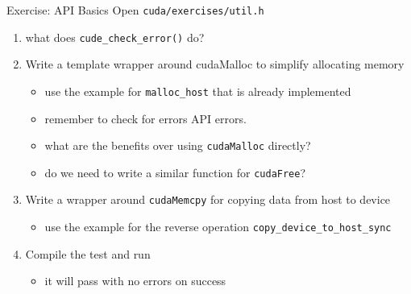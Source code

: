 \documentclass[aspectratio=43]{beamer}
\newcommand{\lst}[1]{\colorbox{white!90!blue}{\lstinline!#1!}}
\begin{document}
\begin{frame}[fragile]{Exercise: API Basics}
    Open \lst{cuda/exercises/util.h}
    \begin{enumerate}
        \item what does \lst{cude_check_error()} do?

        \item Write a template wrapper around cudaMalloc to simplify allocating memory
        \begin{itemize}
            \item use the example for \lst{malloc_host} that is already implemented
            \item remember to check for errors API errors.
            \item what are the benefits over using \lst{cudaMalloc} directly?
            \item do we need to write a similar function for \lst{cudaFree}?
        \end{itemize}

        \item Write a wrapper around \lst{cudaMemcpy} for copying data from host to device
        \begin{itemize}
            \item use the example for the reverse operation \lst{copy_device_to_host_sync}
        \end{itemize}

        \item Compile the test and run
        \begin{itemize}
            \item it will pass with no errors on success
        \end{itemize}
    \end{enumerate}

\end{frame}

\end{document}
